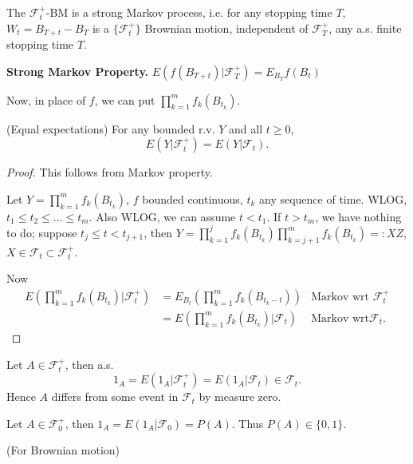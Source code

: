 \begin{corollary}
	The $\mathcal{F}_t^+$-BM is a strong Markov process, i.e. for any stopping time $T$, $W_t = B_{T + t} - B_T$ is a $\{\mathcal{F}_t^+\} $ Brownian motion, independent of $\mathcal{F}_T^+$, any a.s. finite stopping time $T$.
\end{corollary}

\textbf{Strong Markov Property.} $E\left( f(B_{T + t}) | \mathcal{F}_T^+ \right) = E_{B_T}f(B_t)$

Now, in place of $f$, we can put $\prod_{k=1}^{m} f_k\left( B_{t_k} \right)  $.

\begin{theorem}(Equal expectations)
	For any bounded r.v. $Y$ and all $t \ge 0$,
	\[
		E\left( Y | \mathcal{F}_t^+ \right) 
		= E\left( Y | \mathcal{F}_t \right) 
	.\] 
\end{theorem}
\begin{proof}
	This follows from Markov property.

	Let $Y = \prod_{k = 1}^{m} f_k (B_{t_k}) $, $f$ bounded continuous, $t_k$ any sequence of time. WLOG, $t_1 \le  t_2 \le \ldots \le t_m$. Also WLOG, we can assume $t < t_1$. If $t > t_m$, we have nothing to do; suppose $t_j \le  t < t_{j+1}$, then $Y = \prod_{k=1}^{j} f_k(B_{t_k}) \prod_{k=j+1}^{m} f_k(B_{t_k}) =: XZ$, $X \in \mathcal{F}_t \subset \mathcal{F}_t^+$. 

	Now
	\begin{align*}
		E\left( \prod_{k=1}^{m} f_k(B_{t_k}) | \mathcal{F}_t^+  \right) 
		&= E_{B_t}\left(  \prod_{k=1}^{m} f_k(B_{t_k - t}) \right) 
		& \text{Markov wrt }\mathcal{F}_t^+ \\
		&= E\left( \prod_{k=1}^{m} f_k(B_{t_k}) | \mathcal{F}_t  \right) 
		& \text{Markov wrt} \mathcal{F}_t
	.\end{align*}
\end{proof}

\begin{corollary}
	Let $A \in \mathcal{F}_t^+$, then a.s.
	\[
		1_A
		= E\left( 1_A | \mathcal{F}_t^+ \right) 
		= E\left( 1_A | \mathcal{F}_t \right)  \in \mathcal{F}_t
	.\] 
	Hence $A$ differs from some event in $\mathcal{F}_t$ by measure zero.
\end{corollary}

\begin{corollary}
	Let $A \in \mathcal{F}_0^+$, then $1_A = E\left( 1_A | \mathcal{F}_0 \right)  = P(A)$. Thus $P(A) \in \{0,1\} $.
\end{corollary}

\begin{theorem} 
	(For Brownian motion)
	
\end{theorem}

